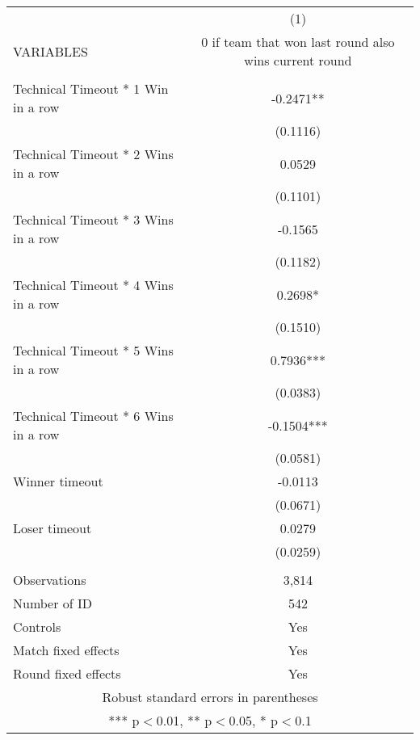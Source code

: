 \documentclass[]{article}
\begin{document}
\begin{tabular}{lc} \hline
 & (1) \\
VARIABLES & 0 if team that won last round also wins current round \\ \hline
 &  \\
Technical Timeout * 1 Win in a row & -0.2471** \\
 & (0.1116) \\
Technical Timeout * 2 Wins in a row & 0.0529 \\
 & (0.1101) \\
Technical Timeout * 3 Wins in a row & -0.1565 \\
 & (0.1182) \\
Technical Timeout * 4 Wins in a row & 0.2698* \\
 & (0.1510) \\
Technical Timeout * 5 Wins in a row & 0.7936*** \\
 & (0.0383) \\
Technical Timeout * 6 Wins in a row & -0.1504*** \\
 & (0.0581) \\
Winner timeout & -0.0113 \\
 & (0.0671) \\
Loser timeout & 0.0279 \\
 & (0.0259) \\
 &  \\
Observations & 3,814 \\
Number of ID & 542 \\
Controls & Yes \\
Match fixed effects & Yes \\
 Round fixed effects & Yes \\ \hline
\multicolumn{2}{c}{ Robust standard errors in parentheses} \\
\multicolumn{2}{c}{ *** p$<$0.01, ** p$<$0.05, * p$<$0.1} \\
\end{tabular}
\end{document}
